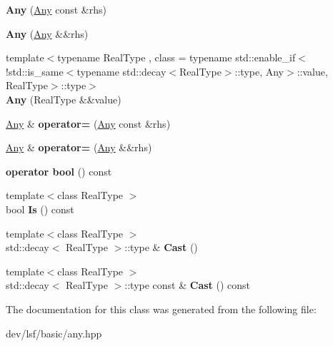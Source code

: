 \begin{DoxyCompactItemize}
\item 
\hypertarget{classlsf_1_1basic_1_1Any_a1624718cc02d80b2a6efb902a8106e58}{
{\bfseries Any} (\hyperlink{classlsf_1_1basic_1_1Any}{Any} const \&rhs)}
\label{classlsf_1_1basic_1_1Any_a1624718cc02d80b2a6efb902a8106e58}

\item 
\hypertarget{classlsf_1_1basic_1_1Any_af8e0726b8075535754e36c090401f5f6}{
{\bfseries Any} (\hyperlink{classlsf_1_1basic_1_1Any}{Any} \&\&rhs)}
\label{classlsf_1_1basic_1_1Any_af8e0726b8075535754e36c090401f5f6}

\item 
\hypertarget{classlsf_1_1basic_1_1Any_a355f25f27d7e755ee04228193bb9c58a}{
{\footnotesize template$<$typename RealType , class  = typename std::enable\_\-if$<$!std::is\_\-same$<$typename std::decay$<$RealType$>$::type, Any$>$::value, RealType$>$::type$>$ }\\{\bfseries Any} (RealType \&\&value)}
\label{classlsf_1_1basic_1_1Any_a355f25f27d7e755ee04228193bb9c58a}

\item 
\hypertarget{classlsf_1_1basic_1_1Any_af626ec9203c95ba6f8f7af8fc3cefe56}{
\hyperlink{classlsf_1_1basic_1_1Any}{Any} \& {\bfseries operator=} (\hyperlink{classlsf_1_1basic_1_1Any}{Any} const \&rhs)}
\label{classlsf_1_1basic_1_1Any_af626ec9203c95ba6f8f7af8fc3cefe56}

\item 
\hypertarget{classlsf_1_1basic_1_1Any_a9d76bb712e93dd30093546cf69e2df4d}{
\hyperlink{classlsf_1_1basic_1_1Any}{Any} \& {\bfseries operator=} (\hyperlink{classlsf_1_1basic_1_1Any}{Any} \&\&rhs)}
\label{classlsf_1_1basic_1_1Any_a9d76bb712e93dd30093546cf69e2df4d}

\item 
\hypertarget{classlsf_1_1basic_1_1Any_a54bde089d64f835c95655f9b8018eeaf}{
{\bfseries operator bool} () const }
\label{classlsf_1_1basic_1_1Any_a54bde089d64f835c95655f9b8018eeaf}

\item 
\hypertarget{classlsf_1_1basic_1_1Any_a0a8b00e5ee9fd3a98c36f25db72a0420}{
{\footnotesize template$<$class RealType $>$ }\\bool {\bfseries Is} () const }
\label{classlsf_1_1basic_1_1Any_a0a8b00e5ee9fd3a98c36f25db72a0420}

\item 
\hypertarget{classlsf_1_1basic_1_1Any_ad779664376e15e14134225e2db91119e}{
{\footnotesize template$<$class RealType $>$ }\\std::decay$<$ RealType $>$::type \& {\bfseries Cast} ()}
\label{classlsf_1_1basic_1_1Any_ad779664376e15e14134225e2db91119e}

\item 
\hypertarget{classlsf_1_1basic_1_1Any_a5c509fd48d047ee82b97fe5969afdb68}{
{\footnotesize template$<$class RealType $>$ }\\std::decay$<$ RealType $>$::type const \& {\bfseries Cast} () const }
\label{classlsf_1_1basic_1_1Any_a5c509fd48d047ee82b97fe5969afdb68}

\end{DoxyCompactItemize}


The documentation for this class was generated from the following file:\begin{DoxyCompactItemize}
\item 
dev/lsf/basic/any.hpp\end{DoxyCompactItemize}
